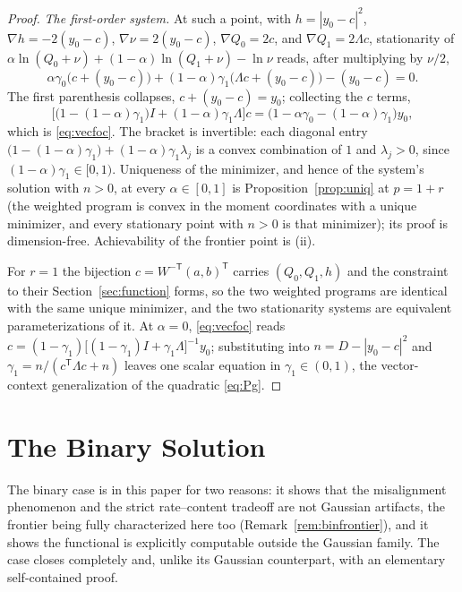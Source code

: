 ﻿\documentclass[11pt,onecolumn]{IEEEtran}
\begin{document}
\begin{proof}
\emph{The first-order system.} At such a point, with
$h=|y_0-c|^2$, $\nabla h=-2(y_0-c)$, $\nabla \nu=2(y_0-c)$,
$\nabla Q_0=2c$, and $\nabla Q_1=2\Lambda c$, stationarity of
$\alpha\ln(Q_0+\nu)+(1-\alpha)\ln(Q_1+\nu)-\ln \nu$ reads, after
multiplying by $\nu/2$,
\[
\alpha\gamma_0\bigl(c+(y_0-c)\bigr)
+(1-\alpha)\gamma_1\bigl(\Lambda c+(y_0-c)\bigr)
-(y_0-c)=0 .
\]
The first parenthesis collapses, $c+(y_0-c)=y_0$; collecting the $c$
terms,
\[
\bigl[\bigl(1-(1-\alpha)\gamma_1\bigr)I
+(1-\alpha)\gamma_1\Lambda\bigr]c
=\bigl(1-\alpha\gamma_0-(1-\alpha)\gamma_1\bigr)y_0,
\]
which is \eqref{eq:vecfoc}. The bracket is invertible: each diagonal
entry $\bigl(1-(1-\alpha)\gamma_1\bigr)+(1-\alpha)\gamma_1\lambda_j$
is a convex combination of $1$ and $\lambda_j>0$, since
$(1-\alpha)\gamma_1\in[0,1)$. Uniqueness of the minimizer, and hence
of the system's solution with $n>0$, at every $\alpha\in[0,1]$ is
Proposition~\ref{prop:uniq} at $p=1+r$ (the weighted program is convex
in the moment coordinates with a unique minimizer, and every
stationary point with $n>0$ is that minimizer); its proof is
dimension-free.
Achievability of the frontier point is (ii).

For $r=1$ the bijection $c=W^{-\mathsf T}(a,b)^{\mathsf T}$ carries
$(Q_0,Q_1,h)$ and the constraint to their Section~\ref{sec:function}
forms, so the two weighted programs are identical with the same unique
minimizer, and the two stationarity systems are equivalent
parameterizations of it. At $\alpha=0$, \eqref{eq:vecfoc} reads
$c=(1-\gamma_1)\bigl[(1-\gamma_1)I+\gamma_1\Lambda\bigr]^{-1}y_0$;
substituting into $n=D-|y_0-c|^2$ and
$\gamma_1=n/(c^{\mathsf T}\Lambda c+n)$ leaves one scalar equation in
$\gamma_1\in(0,1)$, the vector-context generalization of the
quadratic \eqref{eq:Pg}.
\end{proof}

\section{The Binary Solution}
\label{sec:binary}

The binary case is in this paper for two reasons: it shows that the
misalignment phenomenon and the strict rate--content tradeoff are not
Gaussian artifacts, the frontier being fully characterized here too
(Remark~\ref{rem:binfrontier}), and it shows the functional is
explicitly computable outside the Gaussian family. The case closes
completely and, unlike its Gaussian counterpart, with an elementary
self-contained proof.
\end{document}
